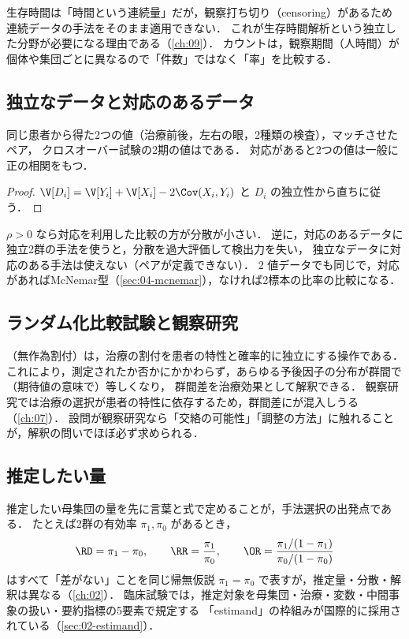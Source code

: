 生存時間は「時間という連続量」だが，観察打ち切り（censoring）があるため連続データの手法をそのまま適用できない．
これが生存時間解析という独立した分野が必要になる理由である（\cref{ch:09}）．
カウントは，観察期間（人時間）が個体や集団ごとに異なるので「件数」ではなく「率」を比較する．

\subsection{独立なデータと対応のあるデータ}\label{subsec:01-paired}
\Hissu 同じ患者から得た2つの値（治療前後，左右の眼，2種類の検査），マッチさせたペア，
クロスオーバー試験の2期の値はである．
対応があると2つの値は一般に正の相関をもつ．

\begin{proof}
$\V[D_i]=\V[Y_i]+\V[X_i]-2\Cov(X_i,Y_i)$ と $D_i$ の独立性から直ちに従う．
\end{proof}
$\rho>0$ なら対応を利用した比較の方が分散が小さい．
逆に，対応のあるデータに独立2群の手法を使うと，分散を過大評価して検出力を失い，
独立なデータに対応のある手法は使えない（ペアが定義できない）．
2 値データでも同じで，対応があればMcNemar型（\cref{sec:04-mcnemar}），なければ2標本の比率の比較になる．

\subsection{ランダム化比較試験と観察研究}\label{subsec:01-rct}
（無作為割付）は，治療の割付を患者の特性と確率的に独立にする操作である．
これにより，測定されたか否かにかかわらず，あらゆる予後因子の分布が群間で（期待値の意味で）等しくなり，
群間差を治療効果として解釈できる．
観察研究では治療の選択が患者の特性に依存するため，群間差にが混入しうる（\cref{ch:07}）．
設問が観察研究なら「交絡の可能性」「調整の方法」に触れることが，解釈の問いでほぼ必ず求められる．

\subsection{推定したい量}\label{subsec:01-estimand}
推定したい母集団の量を先に言葉と式で定めることが，手法選択の出発点である．
たとえば2群の有効率 $\pi_1,\pi_0$ があるとき，
\[
\RD=\pi_1-\pi_0,\qquad \RR=\frac{\pi_1}{\pi_0},\qquad \OR=\frac{\pi_1/(1-\pi_1)}{\pi_0/(1-\pi_0)}
\]
はすべて「差がない」ことを同じ帰無仮説 $\pi_1=\pi_0$ で表すが，推定量・分散・解釈は異なる（\cref{ch:02}）．
臨床試験では，推定対象を母集団・治療・変数・中間事象の扱い・要約指標の5要素で規定する
「estimand」の枠組みが国際的に採用されている（\cref{sec:02-estimand}）．

